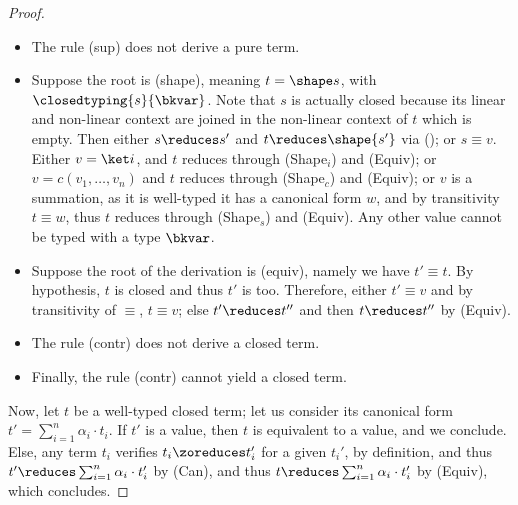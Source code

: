 \begin{proof}
\begin{itemize}
      type, then its canonical form
      consists of one pure term; as $v_1$ has the same canonical form
      by unicity, this term is a value too.
      Thus, $t_1 \equiv 1 \cdot v \equiv v$.
      Now, the only closed, well-typed values of type $C \nonlinfunc T$ or
      $T \linfunc T'$ are either $\lbd x t'$, and as $(\lbd x t')v_2
      \reduces \sigma(t')$
      via (Lbd), then $t \reduces \sigma(t')$ via (Equiv);
      or $\letrec f x t'$ and as $(\letrec f x t')v_2 \reduces \sigma(t')$
      via (Rec), then $t \reduces \sigma(t')$ via (Equiv).
    \item The rule (sup) does not derive a pure term.
    \item Suppose the root is (shape), meaning $t = \shape s$, with
      $\closedtyping{s}{\bkvar}$.
      Note that $s$ is actually closed because its linear and
      non-linear context are joined in the non-linear context of $t$
      which is empty.
      Then either $s \reduces s'$ and $t \reduces \shape{s'}$ via
      (\evalcontext); or $s \equiv v$.
      Either $v = \ket i$, and $t$ reduces through (Shape$_i$) and (Equiv);
      or $v = c(v_1, \dots, v_n)$ and $t$ reduces through (Shape$_c$)
      and (Equiv);
      or $v$ is a summation, as it is well-typed it has a canonical
      form $w$, and by transitivity $t \equiv w$, thus $t$ reduces
      through (Shape$_s$) and (Equiv).
      Any other value cannot be typed with a type $\bkvar$.
    \item Suppose the root of the derivation is (equiv), namely we
      have $t' \equiv t$.
      By hypothesis, $t$ is closed and thus $t'$ is too.
      Therefore, either $t' \equiv v$ and by transitivity of
      $\equiv$, $t \equiv v$; else $t' \reduces t''$ and then $t
      \reduces t''$ by (Equiv).
    \item The rule (contr) does not derive a closed term.
    \item Finally, the rule (contr) cannot yield a closed term.
  \end{itemize}

  Now, let $t$ be a well-typed closed term; let us consider its
  canonical form $t' = \sum_{i=1}^n \alpha_i \cdot t_i$.
  If $t'$ is a value, then $t$ is equivalent to a value, and we conclude.
  Else, any term $t_i$ verifies $t_i \zoreduces t_i'$ for a given
  $t_i'$, by definition, and thus $t' \reduces \sum_{i=1}^n \alpha_i
  \cdot t_i'$ by (Can), and thus $t \reduces \sum_{i=1}^n \alpha_i
  \cdot t_i'$ by (Equiv), which concludes. \qedhere
\end{proof}


